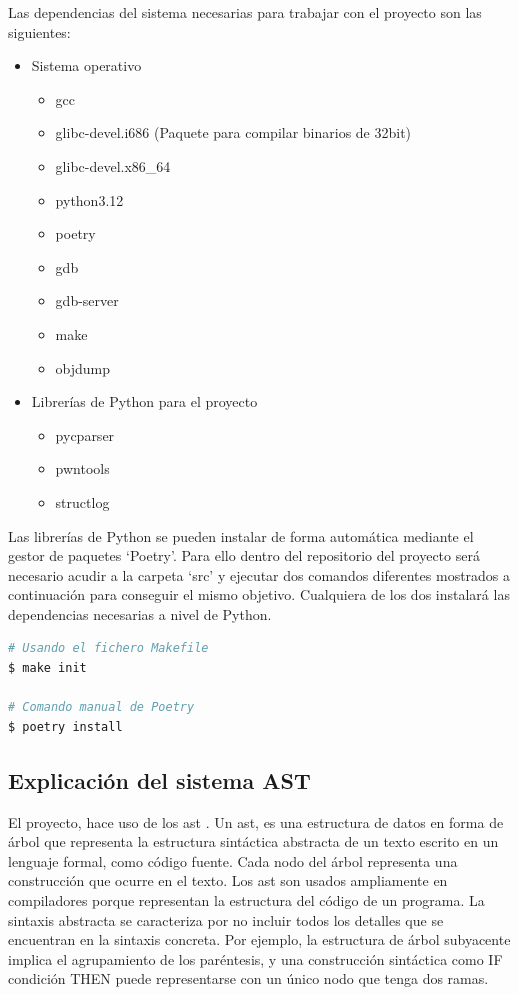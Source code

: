 Las dependencias del sistema necesarias para trabajar con el proyecto son las siguientes:
\begin{itemize}
    \item Sistema operativo
    \begin{itemize}
        \item \acrshort{gcc}
        \item glibc-devel.i686 (Paquete para compilar binarios de 32bit)
        \item glibc-devel.x86\_64
        \item python3.12
        \item poetry \cite{poetry-install}
        \item gdb
        \item gdb-server
        \item make
        \item objdump
    \end{itemize}
    \item Librerías de Python para el proyecto
    \begin{itemize}
        \item pycparser \cite{pycparser}
        \item pwntools \cite{pwntools}
        \item structlog \cite{structlog}
    \end{itemize}
\end{itemize}

Las librerías de Python se pueden instalar de forma automática mediante el gestor de paquetes `Poetry'.
Para ello dentro del repositorio del proyecto será necesario acudir a la carpeta `src' y ejecutar dos comandos diferentes mostrados a continuación para conseguir el mismo objetivo.
Cualquiera de los dos instalará las dependencias necesarias a nivel de Python.

\begin{lstlisting}[language=bash, caption=Instalacion de dependencias Python]
# Usando el fichero Makefile
$ make init

# Comando manual de Poetry
$ poetry install
\end{lstlisting}

\subsection{Explicación del sistema AST}
El proyecto, hace uso de los \acrfull{ast} \cite{ast}. Un \acrshort{ast}, es una estructura de datos en forma de árbol que representa la estructura sintáctica abstracta de un texto escrito en un lenguaje formal, como código fuente.
Cada nodo del árbol representa una construcción que ocurre en el texto.
Los \acrshort{ast} son usados ampliamente en compiladores porque representan la estructura del código de un programa.
La sintaxis abstracta se caracteriza por no incluir todos los detalles que se encuentran en la sintaxis concreta.
Por ejemplo, la estructura de árbol subyacente implica el agrupamiento de los paréntesis, y una construcción sintáctica como IF condición THEN puede representarse con un único nodo que tenga dos ramas.

